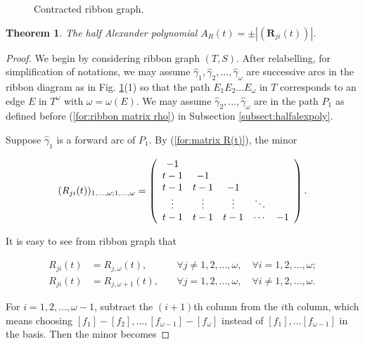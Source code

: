 \documentclass[10pt,a4paper]{amsart}
\newtheorem{thm}{Theorem}
\begin{document}
\begin{figure}
    \centering
    
    \caption{Contracted ribbon graph.}
    \label{fig:contracted ribbon graph}
\end{figure}

\begin{thm}\label{thm:algo2}
The half Alexander polynomial $A_{R}(t)=\pm |( {\textbf{R}}_{ji} (t) )| $.
\end{thm}

\begin{proof}
We begin by considering ribbon graph $(T,S)$. After relabelling, for simplification of notations, we may assume $\hat{\gamma}_{1},\hat{\gamma}_{2},...,\hat{\gamma}_{\omega}$ are successive arcs in the ribbon diagram as in Fig. \ref{fig:contracted ribbon graph}(1) so that the path $E_{1}E_{2}...E_{\omega}$ in $T$ corresponds to an edge $E$ in $T^{\omega}$ with $\omega=\omega(E)$. We may assume $\hat{\gamma}_{2},...,\hat{\gamma}_{\omega}$ are in the path $P_{1}$ as defined before (\ref{for:ribbon matrix rho}) in Subsection \ref{subsect:halfalexpoly}.

Suppose $\hat{\gamma}_{1}$ is a forward arc of $P_{1}$. By (\ref{for:matrix R(t)}), the minor

\begin{equation}
(R_{ji}(t))_{1,...,\omega;1,...,\omega}=\left(\begin{array}[]{ccccc}
-1 & & & & \\
t-1 & -1 & & & \\
t-1 & t-1 & -1 & & \\
\vdots & \vdots & \vdots & \ddots & \\
t-1 & t-1 & t-1 & \cdots & -1
\end{array}\right).
\end{equation}

It is easy to see from ribbon graph that

\begin{align}
R_{ji}(t) &=R_{j,\omega}(t), &\quad \forall j\neq 1,2,...,\omega, \quad \forall i=1,2,...,\omega; \nonumber \\
R_{ji}(t) &=R_{j,\omega+1}(t), &\quad \forall j=1,2,...,\omega, \quad \forall i\neq 1,2,...,\omega. \label{for:Rijt 1tow rows}
\end{align}

For $i=1,2,...,\omega-1$, subtract the $(i+1)$th column from the $i$th column, which means choosing $[f_{1}]-[f_{2}],...,[f_{\omega-1}]-[f_{\omega}]$ instead of $[f_{1}],...[f_{\omega-1}]$ in the basis. Then the minor becomes


\end{proof}
\end{document}
